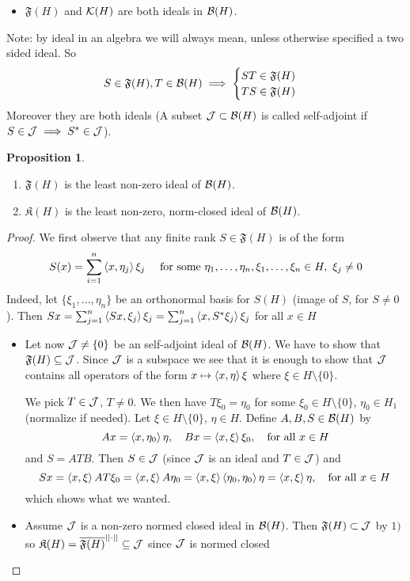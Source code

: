 \documentclass[10pt,english,a4paper]{article}
\theoremstyle{definition}
\newtheorem*{proposition}{Proposition}
\let\emph\relax %
\def\Ff{\mathfrak{F}}
\def\Kf{\mathfrak{K}}
\begin{document}
\begin{itemize}
    \item $\Ff(H)$ and $\mathcal{K}(H)$ are both ideals in $\mathcal{B}(H)$. 
\end{itemize}
Note: by ideal in an algebra we will always mean, unless otherwise specified a two sided ideal.
So 
\[S \in \Ff(H), T \in \Bs(H)  \implies \begin{cases} ST \in \Ff(H) \\ TS \in \Ff(H) \end{cases}\]
Moreover they are both \emph{self-adjoint} ideals (A subset $\mathcal{J} \subset
\mathcal{B}(H)$ is called self-adjoint if $S \in \mathcal{J} \implies S^* \in \mathcal{J}$).
\begin{proposition}
\leavevmode
\begin{enumerate}[1)]
        \item $\Ff(H)$ is the least non-zero ideal of $\mathcal{B}(H)$. 
        \item $\Kf(H)$ is the least non-zero, norm-closed ideal of $\mathcal{B}(H)$. 
    \end{enumerate}
\end{proposition}
\begin{proof}
    We first observe that any finite rank $S \in \Ff(H)$ is of the form 
    \[ S(x) = \sum_{i=1}^{n} \left\langle x,\eta_j \right\rangle\xi_j  \quad \text{ for some }\eta_1, 
    \ldots, \eta_n,\xi_1,\ldots, \xi_n\in H, ~\xi_j \neq 0\]
    Indeed, let $\{\xi_1, \ldots, \eta_n\}$ be an orthonormal basis for $S(H)$ (image of $S$, for $S\neq 0$). Then $Sx = \sum_{j=1}^{n} \left\langle Sx, \xi_j \right\rangle\xi_j = \sum_{j=1}^{n}\left\langle x,S^*\xi_j \right\rangle\xi_j$ for all $x \in H$

\begin{itemize}
    \item 
Let now $\mathcal{J} \neq \{0\}$ be an self-adjoint ideal of $\mathcal{B}(H)$. We have to show that 
$\Ff(H) \subseteq \Js$. Since $\mathcal{J}$ is a subspace we see that it is enough to show that 
$\mathcal{J}$ contains all operators of the form $x\mapsto \left\langle x,\eta \right\rangle\xi$ where $\xi
\in H\setminus\{0\}$.

We pick $T \in \mathcal{J}$, $T \neq 0$. We then have $T\xi_0 = \eta_0$ for some 
$\xi_0 \in H\setminus\{0\}$, $\eta_0 \in H_1$ (normalize if needed). Let
$\xi\in H\setminus\{0\}$, $\eta \in H$. Define $A,B,S \in \mathcal{B}(H)$ by 
\[  Ax = \left\langle x,\eta_0 \right\rangle\eta, \quad Bx = \left\langle x,\xi \right\rangle\xi_0, \quad \text{for all } x\in H \]
and $S = ATB$. Then $S \in \mathcal{J}$ (since $\mathcal{J}$ is an ideal and $T \in \mathcal{J}$) and 
\[Sx = \left\langle x,\xi \right\rangle AT\xi_0 = \left\langle x,\xi \right\rangle A\eta_0 = \left\langle x,\xi \right\rangle \left\langle \eta_0,\eta_0 \right\rangle\eta
= \left\langle x,\xi \right\rangle\eta, \quad \text{for all }x\in H\]
which shows what we wanted.

\item Assume $\mathcal{J}$ is a non-zero normed closed ideal in $\mathcal{B}(H)$. Then $\Ff(H) \subset \Js$
by $1)$ so $\Kf(H) =\ol{\Ff(H)}^{||\cdot||}  \subseteq \Js$ since $\mathcal{J}$ is normed closed
\end{itemize}
\end{proof}
\end{document}
